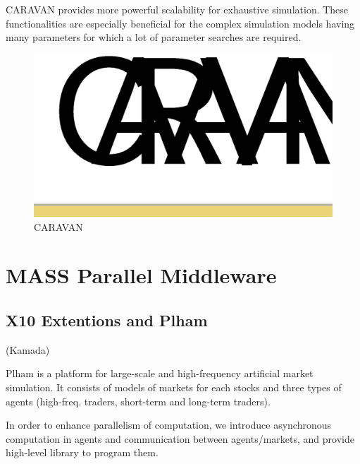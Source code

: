 CARAVAN provides more powerful scalability for exhaustive
simulation. These functionalities are especially beneficial for the
complex simulation models having many parameters for which a lot of
parameter searches are required.

\begin{figure}
  \centering
  \includegraphics[width=.8\linewidth]{Figs.noda/figure-03.caravan.eps}
  \caption{CARAVAN}
  \label{fig:Figs.noda/figure-03.caravan.eps}
\end{figure}

\section{MASS Parallel Middleware}
\label{s:MASS Parallel Middleware}


\subsection{X10 Extentions and Plham}
\label{ss:X10 Extentions and Plham}
(Kamada)

Plham is a platform for large-scale and high-frequency artificial
market simulation.  It consists of models of markets for each stocks
and three types of agents (high-freq. traders, short-term and
long-term traders).

In order to enhance parallelism of computation, we introduce
asynchronous computation in agents and communication between
agents/markets, and provide high-level library to program them.

